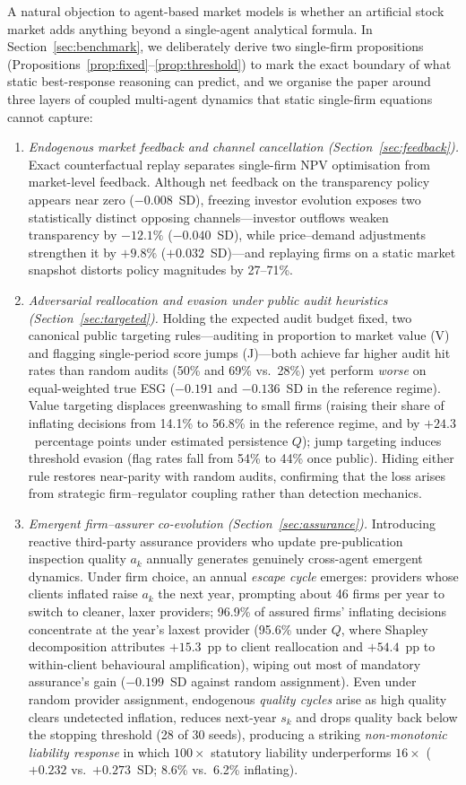 \documentclass[11pt]{article}
\begin{document}
A natural objection to agent-based market models is whether an artificial stock market adds anything beyond a single-agent analytical formula. In Section~\ref{sec:benchmark}, we deliberately derive two single-firm propositions (Propositions~\ref{prop:fixed}--\ref{prop:threshold}) to mark the exact boundary of what static best-response reasoning can predict, and we organise the paper around three layers of coupled multi-agent dynamics that static single-firm equations cannot capture:
\begin{enumerate}[leftmargin=*]
\item \emph{Endogenous market feedback and channel cancellation (Section~\ref{sec:feedback}).} Exact counterfactual replay separates single-firm NPV optimisation from market-level feedback. Although net feedback on the transparency policy appears near zero ($-0.008$~SD), freezing investor evolution exposes two statistically distinct opposing channels---investor outflows weaken transparency by $-12.1\%$ ($-0.040$~SD), while price--demand adjustments strengthen it by $+9.8\%$ ($+0.032$~SD)---and replaying firms on a static market snapshot distorts policy magnitudes by 27--71\%.
\item \emph{Adversarial reallocation and evasion under public audit heuristics (Section~\ref{sec:targeted}).} Holding the expected audit budget fixed, two canonical public targeting rules---auditing in proportion to market value (V) and flagging single-period score jumps (J)---both achieve far higher audit hit rates than random audits (50\% and 69\% vs.\ 28\%) yet perform \emph{worse} on equal-weighted true ESG ($-0.191$ and $-0.136$~SD in the reference regime). Value targeting displaces greenwashing to small firms (raising their share of inflating decisions from 14.1\% to 56.8\% in the reference regime, and by $+24.3$~percentage points under estimated persistence $Q$); jump targeting induces threshold evasion (flag rates fall from 54\% to 44\% once public). Hiding either rule restores near-parity with random audits, confirming that the loss arises from strategic firm--regulator coupling rather than detection mechanics.
\item \emph{Emergent firm--assurer co-evolution (Section~\ref{sec:assurance}).} Introducing reactive third-party assurance providers who update pre-publication inspection quality $a_k$ annually generates genuinely cross-agent emergent dynamics. Under firm choice, an annual \emph{escape cycle} emerges: providers whose clients inflated raise $a_k$ the next year, prompting about 46 firms per year to switch to cleaner, laxer providers; 96.9\% of assured firms' inflating decisions concentrate at the year's laxest provider (95.6\% under $Q$, where Shapley decomposition attributes $+15.3$~pp to client reallocation and $+54.4$~pp to within-client behavioural amplification), wiping out most of mandatory assurance's gain ($-0.199$~SD against random assignment). Even under random provider assignment, endogenous \emph{quality cycles} arise as high quality clears undetected inflation, reduces next-year $s_k$ and drops quality back below the stopping threshold (28 of 30 seeds), producing a striking \emph{non-monotonic liability response} in which $100\times$ statutory liability underperforms $16\times$ ($+0.232$ vs.\ $+0.273$~SD; 8.6\% vs.\ 6.2\% inflating).

\end{enumerate}
\end{document}
